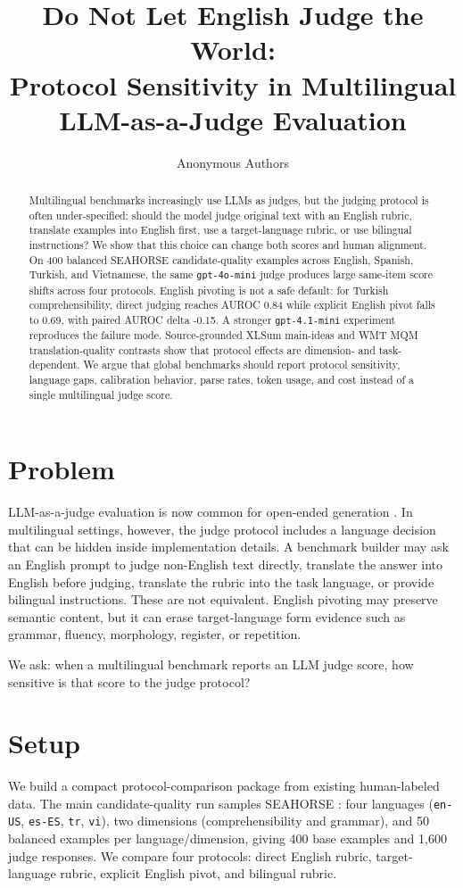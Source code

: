 \documentclass[10pt,twocolumn]{article}
\title{\vspace{-1.5em}Do Not Let English Judge the World:\\Protocol Sensitivity in Multilingual LLM-as-a-Judge Evaluation\vspace{-0.6em}}
\author{Anonymous Authors}
\date{}
\begin{document}
\maketitle
\vspace{-1.2em}
\sloppy

\begin{abstract}
\noindent Multilingual benchmarks increasingly use LLMs as judges, but the judging protocol is often under-specified: should the model judge original text with an English rubric, translate examples into English first, use a target-language rubric, or use bilingual instructions? We show that this choice can change both scores and human alignment. On 400 balanced SEAHORSE candidate-quality examples across English, Spanish, Turkish, and Vietnamese, the same \texttt{gpt-4o-mini} judge produces large same-item score shifts across four protocols. English pivoting is not a safe default: for Turkish comprehensibility, direct judging reaches AUROC 0.84 while explicit English pivot falls to 0.69, with paired AUROC delta -0.15. A stronger \texttt{gpt-4.1-mini} experiment reproduces the failure mode. Source-grounded XLSum main-ideas and WMT MQM translation-quality contrasts show that protocol effects are dimension- and task-dependent. We argue that global benchmarks should report protocol sensitivity, language gaps, calibration behavior, parse rates, token usage, and cost instead of a single multilingual judge score.
\end{abstract}

\section{Problem}
LLM-as-a-judge evaluation is now common for open-ended generation \cite{zheng2023judging,liu2023geval,kocmi2023large}. In multilingual settings, however, the judge protocol includes a language decision that can be hidden inside implementation details. A benchmark builder may ask an English prompt to judge non-English text directly, translate the answer into English before judging, translate the rubric into the task language, or provide bilingual instructions. These are not equivalent. English pivoting may preserve semantic content, but it can erase target-language form evidence such as grammar, fluency, morphology, register, or repetition.

We ask: when a multilingual benchmark reports an LLM judge score, how sensitive is that score to the judge protocol?

\section{Setup}
We build a compact protocol-comparison package from existing human-labeled data. The main candidate-quality run samples SEAHORSE \cite{clark2023seahorse}: four languages (\texttt{en-US}, \texttt{es-ES}, \texttt{tr}, \texttt{vi}), two dimensions (comprehensibility and grammar), and 50 balanced examples per language/dimension, giving 400 base examples and 1,600 judge responses. We compare four protocols: direct English rubric, target-language rubric, explicit English pivot, and bilingual rubric.
\end{document}
